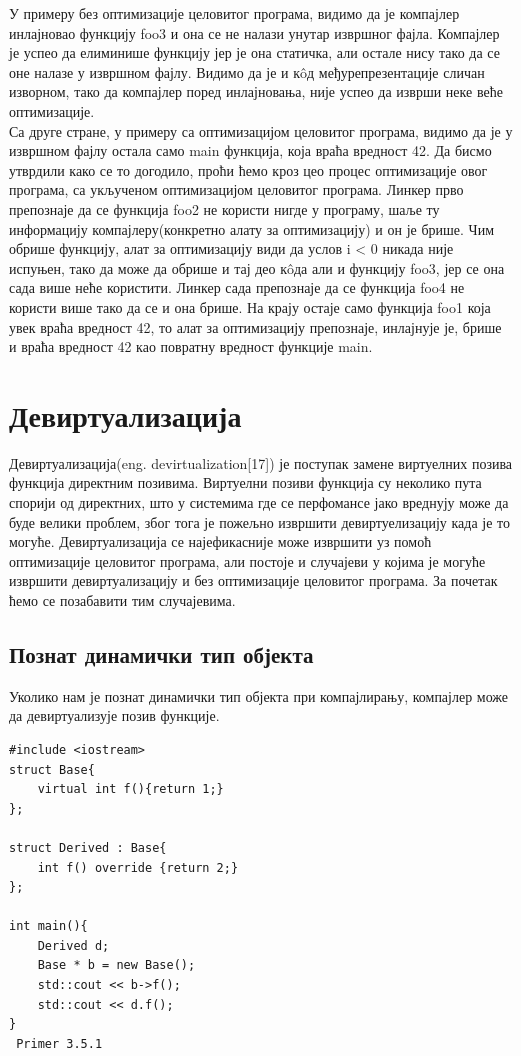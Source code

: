 \documentclass[12pt,oneside]{memoir}
\begin{document}
У примеру без оптимизације целовитог програма, видимо да је компајлер инлајновао
функцију foo3 и она се не налази унутар извршног фајла.
Компајлер је успео да елиминише функцију јер је она статичка, али остале нису
тако да се оне налазе у извршном фајлу.
Видимо да је и к\^{o}д међурепрезентације сличан изворном, тако да компајлер поред
инлајновања, није успео да изврши неке веће оптимизације.
\\
Са друге стране, у примеру са оптимизацијом целовитог програма, видимо да је у
извршном фајлу остала само main функција, која враћа вредност 42.
Да бисмо утврдили како се то догодило, проћи ћемо кроз цео процес оптимизације овог 
програма, са укљученом оптимизацијом целовитог програма.
Линкер прво препознаје да се функција foo2 не користи нигде у програму, шаље ту
информацију компајлеру(конкретно алату за оптимизацију) и он је брише.
Чим обрише функцију, алат за оптимизацију види да услов i < 0 никада није испуњен,
тако да може да обрише и тај део к\^{o}да али и функцију foo3, јер се она сада
више неће користити.
Линкер сада препознаје да се функција foo4 не користи више тако да се и она брише.
На крају остаје само функција foo1 која увек враћа вредност 42, то алат за оптимизацију
препознаје, инлајнује је, брише и враћа вредност 42 као повратну вредност функције
main.

\section{Девиртуализација}
 Девиртуализација(eng. devirtualization[17]) је поступак замене виртуелних позива
 функција директним позивима.
 Виртуелни позиви функција су неколико пута спорији од директних, што у системима
 где се перфомансе јако вреднују може да буде велики проблем, због тога је 
 пожељно извршити девиртуелизацију када је то могуће.
 Девиртуализација се најефикасније може извршити уз помоћ оптимизације целовитог
 програма, али постоје и случајеви у којима је могуће извршити девиртуализацију 
 и без оптимизације целовитог програма.
 За почетак ћемо се позабавити тим случајевима.
 
 \subsection{Познат динамички тип објекта}
 Уколико нам је познат динамички тип објекта при компајлирању, компајлер може 
 да девиртуализује позив функције.
 
 \begin{lstlisting}
#include <iostream>
struct Base{
    virtual int f(){return 1;}
};

struct Derived : Base{
    int f() override {return 2;}
};

int main(){
    Derived d;
    Base * b = new Base();
    std::cout << b->f();
    std::cout << d.f();  
}
 Primer 3.5.1
 \end{lstlisting}
 
\end{document}
